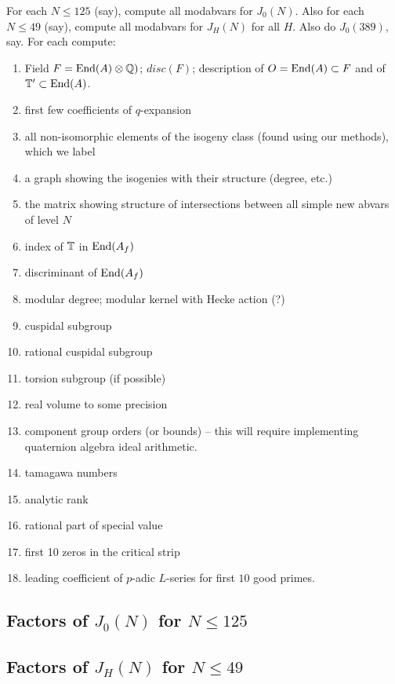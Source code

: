 \documentclass{article}
\begin{document}
For each $N\leq 125$ (say), compute all modabvars for $J_0(N)$.
Also for each $N\leq 49$ (say), compute all modabvars for $J_H(N)$ for
all $H$.  Also do $J_0(389)$, say.
For each compute:
\begin{enumerate}
	\item Field $F = \operatorname{End}(A)\otimes \mathbb{Q})$; $disc(F)$; description of $O=\operatorname{End}(A) \subset F$ and of $\mathbb{T}'\subset \operatorname{End}(A)$.
	\item first few coefficients of $q$-expansion
	\item all non-isomorphic elements of the isogeny class (found using our methods),
	      which we label
	\item a graph showing the isogenies with their structure (degree, etc.)
	\item the matrix showing structure of intersections between all simple new
	      abvars of level $N$
	\item index of $\mathbb{T}$ in $\operatorname{End}(A_f)$
	\item discriminant of $\operatorname{End}(A_f)$
	\item modular degree; modular kernel with Hecke action (?)
	\item cuspidal subgroup
	\item rational cuspidal subgroup
	\item torsion subgroup (if possible)
	\item real volume to some precision
	\item component group orders (or bounds) -- this will require
	      implementing quaternion algebra ideal arithmetic.
	\item tamagawa numbers
	\item analytic rank
	\item rational part of special value
	\item first 10 zeros in the critical strip
	\item leading coefficient of $p$-adic $L$-series
	      for first $10$ good primes.
\end{enumerate}

\subsection{Factors of $J_0(N)$ for $N\leq 125$}

\subsection{Factors of $J_H(N)$ for $N\leq 49$}
\end{document}
